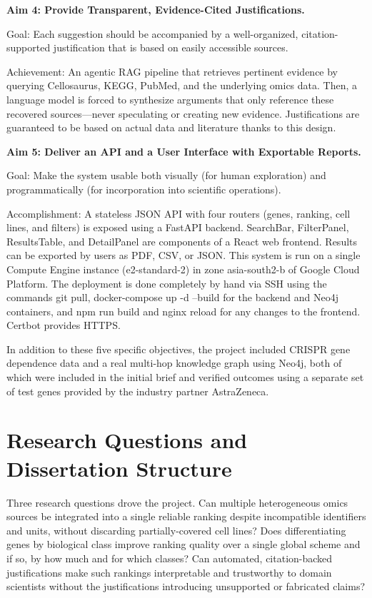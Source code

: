 \documentclass[author={Karen Coutinho, Ishaan Bhalla, Aman Raj, Dixit Kaloorani Malarmannan},
                supervisor={Dr. Daniel D'Andrea},
                degree={MSc},
                title={CellSelector Omics: A Multi-Omics Recommendation System for Cell Line Selection},
                subtitle={},
                type={},
                year={2026}]{dissertation}
\begin{document}
{\bf Aim 4: Provide Transparent, Evidence-Cited Justifications.}

Goal: Each suggestion should be accompanied by a well-organized, citation-supported justification that is based on easily accessible sources.

Achievement: An agentic RAG pipeline that retrieves pertinent evidence by querying Cellosaurus, KEGG, PubMed, and the underlying omics data. Then, a language model is forced to synthesize arguments that only reference these recovered sources—never speculating or creating new evidence. Justifications are guaranteed to be based on actual data and literature thanks to this design.

{\bf Aim 5: Deliver an API and a User Interface with Exportable Reports.}

Goal: Make the system usable both visually (for human exploration) and programmatically (for incorporation into scientific operations).

Accomplishment: A stateless JSON API with four routers (genes, ranking, cell lines, and filters) is exposed using a FastAPI backend. SearchBar, FilterPanel, ResultsTable, and DetailPanel are components of a React web frontend. Results can be exported by users as PDF, CSV, or JSON. This system is run on a single Compute Engine instance (e2-standard-2) in zone asia-south2-b of Google Cloud Platform. The deployment is done completely by hand via SSH using the commands git pull, docker-compose up -d --build for the backend and Neo4j containers, and npm run build and nginx reload for any changes to the frontend. Certbot provides HTTPS.

In addition to these five specific objectives, the project included CRISPR gene dependence data and a real multi-hop knowledge graph using Neo4j, both of which were included in the initial brief and verified outcomes using a separate set of test genes provided by the industry partner AstraZeneca.

\section{Research Questions and Dissertation Structure}

Three research questions drove the project. Can multiple heterogeneous omics sources be integrated into a single reliable ranking despite incompatible identifiers and units, without discarding partially-covered cell lines? Does differentiating genes by biological class improve ranking quality over a single global scheme and if so, by how much and for which classes? Can automated, citation-backed justifications make such rankings interpretable and trustworthy to domain scientists without the justifications introducing unsupported or fabricated claims?
\end{document}
